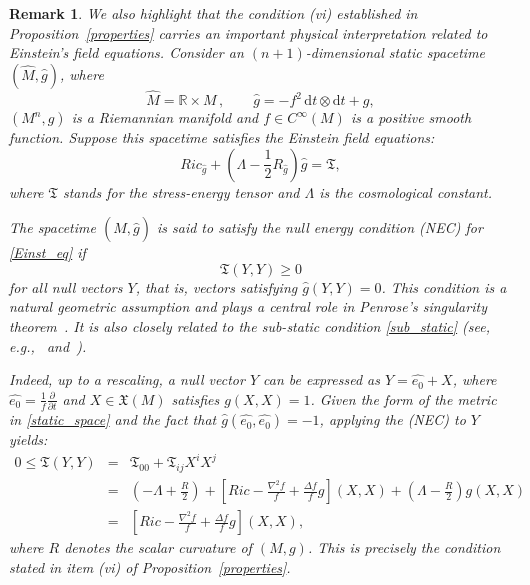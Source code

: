 \documentclass{amsart}
\newtheorem{remark}{Remark}
\numberwithin{equation}{section}
\begin{document}
\begin{remark}
\label{sub_sta}
We also highlight that the condition (vi) established in Proposition~\ref{properties} carries an important physical interpretation related to Einstein's field equations. Consider an $(n+1)$-dimensional static spacetime $(\widehat{M}, \hat{g})$, where
\begin{equation}\label{static_space}
    \widehat{M} = \mathbb{R} \times M \, , \qquad \hat{g} = -f^2 \, \mathrm{d}t \otimes \mathrm{d}t + g,
\end{equation} $(M^n, g)$ is a Riemannian manifold and $f \in C^\infty(M)$ is a positive smooth function. Suppose this spacetime satisfies the Einstein field equations:
\begin{equation}\label{Einst_eq}
    Ric_{\hat{g}} + \left( \Lambda - \frac{1}{2} R_{\hat{g}} \right) \hat{g} = \mathfrak{T},
\end{equation} where $\mathfrak{T}$ stands for the stress-energy tensor and $\Lambda$ is the cosmological constant.

The spacetime $(\widehat{M}, \hat{g})$ is said to satisfy the \emph{null energy condition (NEC)} for \eqref{Einst_eq} if
\[
\mathfrak{T}(Y, Y) \geq 0
\]
for all null vectors $Y$, that is, vectors satisfying $\hat{g}(Y, Y) = 0$. This condition is a natural geometric assumption and plays a central role in Penrose’s singularity theorem~\cite{penrose}. It is also closely related to the sub-static condition \eqref{sub_static} (see, e.g.,~\cite[Lemma~3.8]{wang} and~\cite[Section~2]{cfmr}).

Indeed, up to a rescaling, a null vector $Y$ can be expressed as $Y = \widehat{e_0} + X$, where $\widehat{e_0} = \frac{1}{f} \frac{\partial}{\partial t}$ and $X \in \mathfrak{X}(M)$ satisfies $g(X, X) = 1$. Given the form of the metric in \eqref{static_space} and the fact that $\hat{g}(\widehat{e_0}, \widehat{e_0}) = -1$, applying the (NEC) to $Y$ yields:
\begin{eqnarray*}
    0 \leq \mathfrak{T}(Y, Y) &=& \mathfrak{T}_{00} + \mathfrak{T}_{ij} X^i X^j \\
    &=& \left( -\Lambda + \frac{R}{2} \right) + \left[ Ric - \frac{\nabla^2 f}{f} + \frac{\Delta f}{f} g \right] (X, X) + \left( \Lambda - \frac{R}{2} \right) g(X, X) \\
    &=& \left[ Ric - \frac{\nabla^2 f}{f} + \frac{\Delta f}{f} g \right] (X, X),
\end{eqnarray*}
where $R$ denotes the scalar curvature of $(M, g)$. This is precisely the condition stated in item (vi) of Proposition~\ref{properties}.

\end{remark}
	
\end{document}

